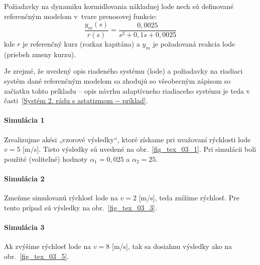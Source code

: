 \documentclass[a4paper, 10pt, ]{article}
\begin{document}
Požiadavky na dynamiku kormidlovania nákladnej lode nech sú definované referenčným modelom v~tvare prenosovej funkcie:
\begin{equation}
	\frac{y_m(s)}{r(s)} = \frac{0,0025 }{s^2 + 0,1 s + 0,0025}
\end{equation}
kde $r$ je referenčný kurz (rozkaz kapitána) a $y_m$ je požadovaná reakcia lode (priebeh zmeny kurzu).


Je zrejmé, že uvedený opis riadeného systému (lode) a požiadavky na riadiaci systém dané referenčným modelom sa zhodujú so všeobecným zápisom so začiatku tohto príkladu -- opis návrhu adaptívneho riadiaceho systému je teda v časti~\ref{Systém 2. rádu s astatizmom -- príklad}.



\paragraph{Simulácia 1}

Zrealizujme akési „vzorové výsledky“, ktoré získame pri uvažovaní rýchlosti lode $v = 5$ [m/s]. Tieto výsledky sú uvedené na obr.~\ref{fig_tex_03_1}. Pri simulácii boli použité (voliteľné) hodnoty $\alpha_1 = 0,025$ a $\alpha_2 = 25$.













\paragraph{Simulácia 2}

Zmeňme simulovanú rýchlosť lode na $v = 2$ [m/s], teda znížime rýchlosť. Pre tento prípad sú výsledky na obr.~\ref{fig_tex_03_3}.













\paragraph{Simulácia 3}

Ak zvýšime rýchlosť lode na $v = 8$ [m/s], tak sa dosiahnu výsledky ako na obr.~\ref{fig_tex_03_5}.
\end{document}
